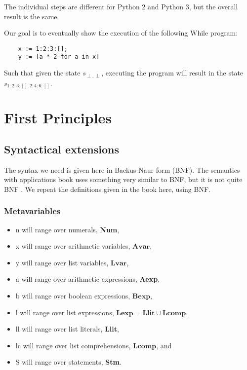 \documentclass[12pt]{article}
\newcommand{\metavar}[1]{\textlangle#1\textrangle}
\newcommand{\Avar}{\mathbf{Avar}}
\newcommand{\Lvar}{\mathbf{Lvar}}
\newcommand{\Bexp}{\mathbf{Bexp}}
\newcommand{\Lexp}{\mathbf{Lexp}}
\newcommand{\Llit}{\mathbf{Llit}}
\newcommand{\Lcomp}{\mathbf{Lcomp}}
\begin{document}
The individual steps are different for Python 2 and Python 3, but the overall result is the same.

Our goal is to eventually show the execution of the following While program:

\begin{lstlisting}
    x := 1:2:3:[];
    y := [a * 2 for a in x]
\end{lstlisting}

Such that given the state $s_{\perp, \perp}$, executing the program will result in the state $s_{1:2:3:[], 2:4:6:[]}$.

\section{First Principles}

\subsection{Syntactical extensions}

The syntax we need is given here in Backus-Naur form (BNF). The semantics with applications book uses something very similar to BNF, but it is not quite BNF \cite[section 1.2]{wiley}. We repeat the definitions given in the book here, using BNF.

\subsubsection{Metavariables}

\begin{itemize}
    \item \metavar{n} will range over numerals, \textbf{Num},
    \item \metavar{x} will range over arithmetic variables, $\Avar$,
    \item \metavar{y} will range over list variables, $\Lvar$,
    \item \metavar{a} will range over arithmetic expressions, \textbf{Aexp},
    \item \metavar{b} will range over boolean expressions, $\Bexp$,
    \item \metavar{l} will range over list expressions, $\Lexp = \Llit \cup \Lcomp$,
    \item \metavar{ll} will range over list literals, $\Llit$,
    \item \metavar{lc} will range over list comprehensions, $\Lcomp$, and
    \item \metavar{S} will range over statements, \textbf{Stm}.
\end{itemize}
\end{document}
